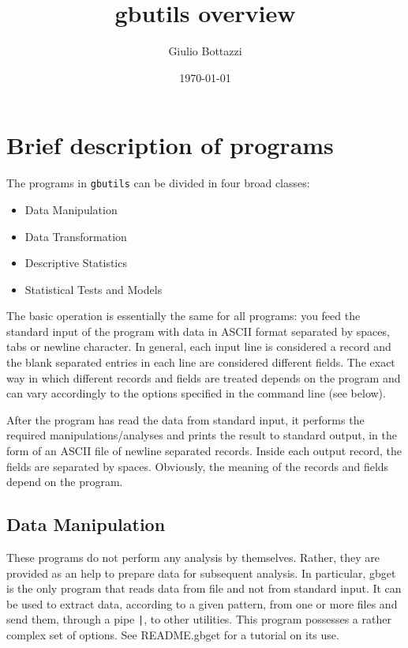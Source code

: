 \documentclass[11pt]{article}
\author{Giulio Bottazzi}
\date{\today}
\title{gbutils overview}
\begin{document}
\maketitle
\tableofcontents


\section{Brief description of programs}
\label{sec-1}

The programs in \verb~gbutils~ can be divided in four broad classes:

\begin{itemize}
\item Data Manipulation

\item Data Transformation

\item Descriptive Statistics

\item Statistical Tests and Models
\end{itemize}

The basic operation is essentially the same for all programs: you feed
the standard input of the program with data in ASCII format separated
by spaces, tabs or newline character. In general, each input line is
considered a record and the blank separated entries in each line are
considered different fields. The exact way in which different records
and fields are treated depends on the program and can vary accordingly
to the options specified in the command line (see below).

After the program has read the data from standard input, it performs
the required manipulations/analyses and prints the result to standard
output, in the form of an ASCII file of newline separated
records. Inside each output record, the fields are separated by
spaces. Obviously, the meaning of the records and fields depend on the
program.

\subsection{Data Manipulation}
\label{sec-1-1}

These programs do not perform any analysis by themselves. Rather, they
are provided as an help to prepare data for subsequent analysis. In
particular, gbget is the only program that reads data from file and
not from standard input. It can be used to extract data, according to
a given pattern, from one or more files and send them, through a pipe
\verb~|~, to other utilities. This program possesses a rather complex set
of options. See README.gbget for a tutorial on its use.
\end{document}
